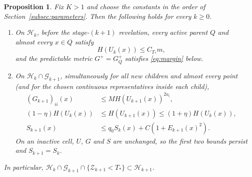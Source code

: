 \documentclass[11pt]{article}
\newtheorem{proposition}[proposition]{Proposition}
\theoremstyle{definition}
\theoremstyle{remark}
\numberwithin{equation}{section}
\begin{document}
\begin{proposition}\label{prop:bootstrap}
Fix $K>1$ and choose the constants in the order of
Section~\ref{subsec:parameters}. Then the following holds for every
$k\ge0$.
\begin{enumerate}[label=(\roman*),leftmargin=2.7em]
\item On $\mathcal H_k$, before the stage-$(k+1)$ revelation, every
  active parent $Q$ and almost every $x\in Q$ satisfy
  \begin{equation}\label{eq:Hcap}
   H(U_k(x))\le C_{T_*}m,
  \end{equation}
  and the predictable metric $G^+=G_Q^+$ satisfies
  \eqref{eq:margin} below.
\item On $\mathcal H_k\cap\mathcal G_{k+1}$, simultaneously for all
  new children and almost every point (and for the chosen continuous
  representatives inside each child),
  \begin{align}\label{eq:threecaps}
    (G_{k+1})_{ii}(x)&\le M H(U_{k+1}(x))^{2a_i},\\
    (1-\eta)H(U_k(x))&\le H(U_{k+1}(x))
                      \le(1+\eta)H(U_k(x)),\nonumber\\
    S_{k+1}(x)&\le q_0S_k(x)+C(1+E_{k+1}(x)^2).\nonumber
  \end{align}
  On an inactive cell, $U$, $G$ and $S$ are unchanged, so the first
  two bounds persist and $S_{k+1}=S_k$.
\end{enumerate}
In particular,
$\mathcal H_k\cap\mathcal G_{k+1}\cap\{\mathcal Z_{k+1}<T_*\}
\subset\mathcal H_{k+1}$.
\end{proposition}
\end{document}
